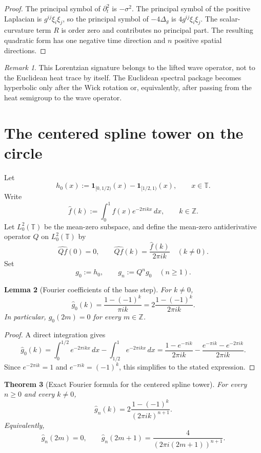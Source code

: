 \documentclass[11pt,a4paper]{article}
\numberwithin{equation}{section}
\newtheorem{theorem}{Theorem}[section]
\newtheorem{lemma}[theorem]{Lemma}
\theoremstyle{definition}
\theoremstyle{remark}
\newtheorem{remark}[theorem]{Remark}
\newcommand{\ZZ}{\mathbb Z}
\begin{document}
\begin{proof}
The principal symbol of $\partial_t^2$ is $-\sigma^2$.  The principal symbol of the positive Laplacian is $g^{ij}\xi_i\xi_j$, so the principal symbol of $-4\Delta_g$ is $4g^{ij}\xi_i\xi_j$.  The scalar-curvature term $R$ is order zero and contributes no principal part.  The resulting quadratic form has one negative time direction and $n$ positive spatial directions.
\end{proof}

\begin{remark}
This Lorentzian signature belongs to the lifted wave operator, not to the Euclidean heat trace by itself.  The Euclidean spectral package becomes hyperbolic only after the Wick rotation or, equivalently, after passing from the heat semigroup to the wave operator.
\end{remark}

\section{The centered spline tower on the circle}

Let
\[
h_0(x):=\mathbf 1_{[0,1/2)}(x)-\mathbf 1_{[1/2,1)}(x),
\qquad x\in\mathbb T.
\]
Write
\[
\widehat f(k):=\int_0^1 f(x)e^{-2\pi ikx}\,dx,
\qquad k\in\ZZ.
\]
Let $L^2_0(\mathbb T)$ be the mean-zero subspace, and define the mean-zero antiderivative operator $Q$ on $L^2_0(\mathbb T)$ by
\[
\widehat{Qf}(0)=0,
\qquad
\widehat{Qf}(k)=\frac{\widehat f(k)}{2\pi ik}\quad(k\neq 0).
\]
Set
\[
g_0:=h_0,
\qquad
g_n:=Q^n g_0\quad(n\ge 1).
\]

\begin{lemma}[Fourier coefficients of the base step]\label{mod:g0-fourier}
For $k\neq 0$,
\[
\widehat g_0(k)=\frac{1-(-1)^k}{\pi ik}
=
2\frac{1-(-1)^k}{2\pi ik}.
\]
In particular, $\widehat g_0(2m)=0$ for every $m\in\ZZ$.
\end{lemma}

\begin{proof}
A direct integration gives
\[
\widehat g_0(k)
=
\int_0^{1/2}e^{-2\pi ikx}\,dx-\int_{1/2}^1 e^{-2\pi ikx}\,dx
=
\frac{1-e^{-\pi ik}}{2\pi ik}-\frac{e^{-\pi ik}-e^{-2\pi ik}}{2\pi ik}.
\]
Since $e^{-2\pi ik}=1$ and $e^{-\pi ik}=(-1)^k$, this simplifies to the stated expression.
\end{proof}

\begin{theorem}[Exact Fourier formula for the centered spline tower]\label{mod:g_n-fourier}
For every $n\ge 0$ and every $k\neq 0$,
\[
\widehat g_n(k)
=
2\frac{1-(-1)^k}{(2\pi ik)^{n+1}}.
\]
Equivalently,
\[
\widehat g_n(2m)=0,
\qquad
\widehat g_n(2m+1)=\frac{4}{(2\pi i(2m+1))^{n+1}}.
\]
\end{theorem}
\end{document}
